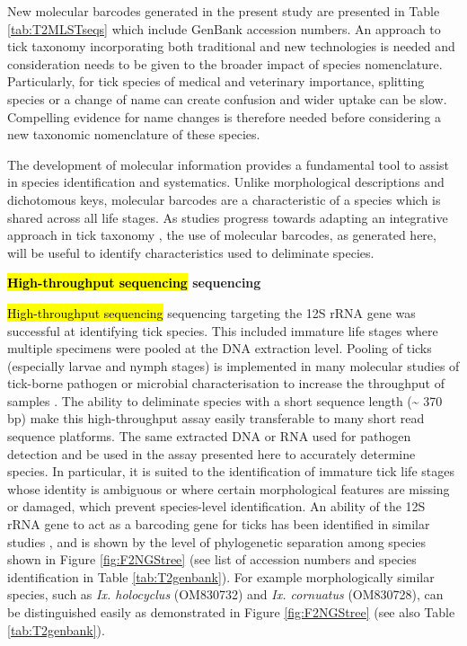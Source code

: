\documentclass[a4paper, nobind]{templates/ociamthesis}
\begin{document}
New molecular barcodes generated in the present study are presented in Table \ref{tab:T2MLSTseqs} which include GenBank accession numbers.
An approach to tick taxonomy incorporating both traditional and new technologies is needed and consideration needs to be given to the broader impact of species nomenclature.
Particularly, for tick species of medical and veterinary importance, splitting species or a change of name can create confusion and wider uptake can be slow.
Compelling evidence for name changes is therefore needed before considering a new taxonomic nomenclature of these species.

The development of molecular information provides a fundamental tool to assist in species identification and systematics.
Unlike morphological descriptions and dichotomous keys, molecular barcodes are a characteristic of a species which is shared across all life stages.
As studies progress towards adapting an integrative approach in tick taxonomy \autocite{dantas-torresSpeciesConceptsWhat2018}, the use of molecular barcodes, as generated here, will be useful to identify characteristics used to deliminate species.

\textbf{\hl{High-throughput sequencing} sequencing}

\hl{High-throughput sequencing} sequencing targeting the 12S rRNA gene was successful at identifying tick species.
This included immature life stages where multiple specimens were pooled at the DNA extraction level.
Pooling of ticks (especially larvae and nymph stages) is implemented in many molecular studies of tick-borne pathogen or microbial characterisation to increase the throughput of samples \autocite{estrada-penaPitfallsTickTickBorne2021}.
The ability to deliminate species with a short sequence length (\textasciitilde{} 370 bp) make this high-throughput assay easily transferable to many short read sequence platforms.
The same extracted DNA or RNA used for pathogen detection and be used in the assay presented here to accurately determine species.
In particular, it is suited to the identification of immature tick life stages whose identity is ambiguous or where certain morphological features are missing or damaged, which prevent species-level identification.
An ability of the 12S rRNA gene to act as a barcoding gene for ticks has been identified in similar studies \autocite{lvAssessmentFourDNA2014,kandumaMitochondrialNuclearMultilocus2019}, and is shown by the level of phylogenetic separation among species shown in Figure \ref{fig:F2NGStree} (see list of accession numbers and species identification in Table \ref{tab:T2genbank}).
For example morphologically similar species, such as \emph{Ix. holocyclus} (OM830732) and \emph{Ix. cornuatus} (OM830728), can be distinguished easily as demonstrated in Figure \ref{fig:F2NGStree} (see also Table \ref{tab:T2genbank}).
\end{document}
